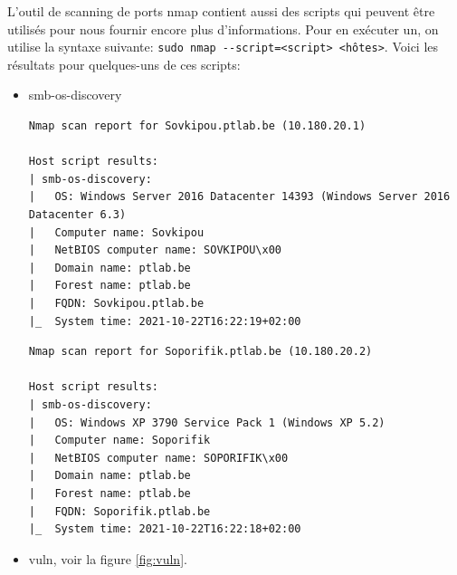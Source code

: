 \documentclass[french,paper=a4,oneside,captions=tableheading]{article}
\begin{document}
L'outil de scanning de ports nmap contient aussi des scripts qui peuvent être utilisés pour nous fournir encore plus d'informations. Pour en exécuter un, on utilise la syntaxe suivante: \texttt{sudo nmap -{}-script=<script> <hôtes>}. Voici les résultats pour quelques-uns de ces scripts:
\begin{itemize}

\item smb-os-discovery
\begin{example}
\begin{Verbatim}
Nmap scan report for Sovkipou.ptlab.be (10.180.20.1)

Host script results:
| smb-os-discovery: 
|   OS: Windows Server 2016 Datacenter 14393 (Windows Server 2016 Datacenter 6.3)
|   Computer name: Sovkipou
|   NetBIOS computer name: SOVKIPOU\x00
|   Domain name: ptlab.be
|   Forest name: ptlab.be
|   FQDN: Sovkipou.ptlab.be
|_  System time: 2021-10-22T16:22:19+02:00
\end{Verbatim}
\end{example}
\hspace{0.3cm}
\begin{example}
\begin{Verbatim}
Nmap scan report for Soporifik.ptlab.be (10.180.20.2)

Host script results:
| smb-os-discovery: 
|   OS: Windows XP 3790 Service Pack 1 (Windows XP 5.2)
|   Computer name: Soporifik
|   NetBIOS computer name: SOPORIFIK\x00
|   Domain name: ptlab.be
|   Forest name: ptlab.be
|   FQDN: Soporifik.ptlab.be
|_  System time: 2021-10-22T16:22:18+02:00
\end{Verbatim}
\end{example}

\item vuln, voir la figure \ref{fig:vuln}.


\end{itemize}
\end{document}
